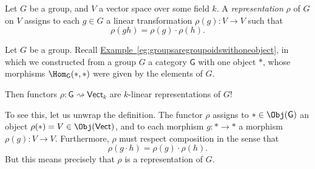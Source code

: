 \documentclass[notes.tex]{subfiles}
\begin{document}
\begin{example}
  \label{eg:functorscanbegrouprepresentation}
  Let $G$ be a group, and $V$ a vector space over some field $k$. A \emph{representation} $\rho$ of $G$ on $V$ assigns to each $g \in G$ a linear transformation $\rho(g)\colon V \to V$ such that
  \begin{equation*}
    \rho(gh) = \rho(g)\cdot \rho(h).
  \end{equation*}

  Let $G$ be a group. Recall \hyperref[eg:groupsaregroupoidswithoneobject]{Example~\ref*{eg:groupsaregroupoidswithoneobject}}, in which we constructed from a group $G$ a category $\mathsf{G}$ with one object $*$, whose morphisms $\Hom_{\mathsf{G}}(*, *)$ were given by the elements of $G$.

  Then functors $\rho\colon \mathsf{G} \rightsquigarrow \mathsf{Vect}_{k}$ are $k$-linear representations of $G$!

  To see this, let us unwrap the definition. The functor $\rho$ assigns to $* \in \Obj(\mathsf{G})$ an object $\rho(*) = V \in \Obj(\mathsf{Vect})$, and to each morphism $g\colon * \to *$ a morphism $\rho(g)\colon V \to V$. Furthermore, $\rho$ must respect composition in the sense that
  \begin{equation*}
    \rho(g\cdot h) = \rho(g)\cdot \rho(h).
  \end{equation*}
  But this means precisely that $\rho$ is a representation of $G$.
\end{example}
\end{document}
